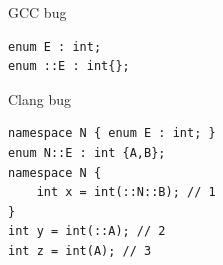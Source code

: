 \documentclass[11pt]{beamer}
\begin{document}



\begin{frame}[fragile=singleslide]{GCC bug}
\begin{lstlisting}
enum E : int;
enum ::E : int{};
\end{lstlisting}
\end{frame}

%
\begin{frame}[fragile=singleslide]{Clang bug}
\begin{lstlisting}
namespace N { enum E : int; }
enum N::E : int {A,B};
namespace N {
    int x = int(::N::B); // 1
}
int y = int(::A); // 2
int z = int(A); // 3
\end{lstlisting}
\end{frame}


\end{document}
